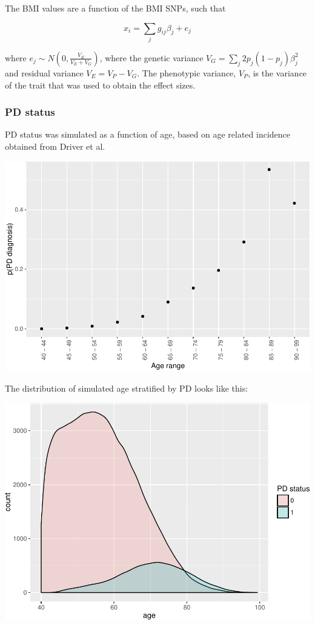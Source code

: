 \documentclass[]{article}
\begin{document}
The BMI values are a function of the BMI SNPs, such that

\[
x_{i} = \sum_{j} g_{ij} \beta_{j} + e_{j}
\]

where \(e_{j} \sim N(0, \frac{V_E}{V_E + V_G})\), where the genetic
variance \(V_G = \sum_{j} 2p_{j}(1-p_{j})\beta_j^2\) and residual
variance \(V_E = V_P - V_G\). The phenotypic variance, \(V_P\), is the
variance of the trait that was used to obtain the effect sizes.

\subsubsection{PD status}\label{pd-status}

PD status was simulated as a function of age, based on age related
incidence obtained from Driver et al.

\includegraphics{images/pd_hr-1.pdf}

The distribution of simulated age stratified by PD looks like this:

\includegraphics{images/simulated_age_dist-1.pdf}
\end{document}
